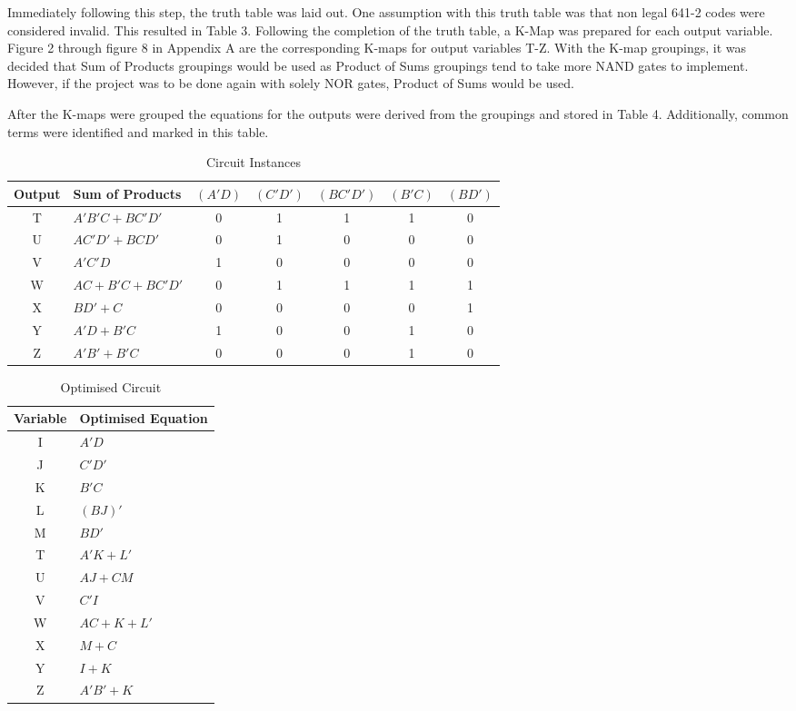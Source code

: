 \documentclass[12pt,letterpaper,titlepage]{article}
\begin{document}
\begin{raggedright}
Immediately following this step, the truth table was laid out. One assumption with this truth table was that non legal 641-2 codes were considered invalid. This resulted in Table 3. Following the completion of the truth table, a K-Map was prepared for each output variable. Figure 2 through figure 8 in Appendix A are the corresponding K-maps for output variables T-Z. With the K-map groupings, it was decided that Sum of Products groupings would be used as Product of Sums groupings tend to take more NAND gates to implement. However, if the project was to be done again with solely NOR gates, Product of Sums would be used.

After the K-maps were grouped the equations for the outputs were derived from the groupings and stored in Table 4. Additionally, common terms were identified and marked in this table.

\begin{table}[ht]
\centering
\begin{tabular}{|c|l|c|c|c|c|c|}\hline
Output & Sum of Products & $(A'D)$ & $(C'D')$ & $(BC'D')$ & $(B'C)$ & $(BD')$ \\\hline
T & $A'B'C+BC'D'$  & 0 & 1 & 1 & 1 & 0 \\\hline
U & $AC'D'+BCD'$   & 0 & 1 & 0 & 0 & 0 \\\hline
V & $A'C'D$        & 1 & 0 & 0 & 0 & 0 \\\hline
W & $AC+B'C+BC'D'$ & 0 & 1 & 1 & 1 & 1 \\\hline
X & $BD'+C$        & 0 & 0 & 0 & 0 & 1 \\\hline
Y & $A'D+B'C$      & 1 & 0 & 0 & 1 & 0 \\\hline
Z & $A'B'+B'C$     & 0 & 0 & 0 & 1 & 0 \\\hline
\end{tabular}
\caption{Circuit Instances}
\end{table}

\newpage
\begin{table}
\centering
\def\arraystretch{1.5}
\begin{tabular}{|c|l|}\hline
Variable & Optimised Equation \\\hline
I  & $A'D$                  \\\hline
J  & $C'D'$                 \\\hline
K  & $B'C$                  \\\hline
L  & $(BJ)'$                \\\hline
M  & $BD'$                  \\\hline
T  & $A'K+L'$               \\\hline
U  & $AJ+CM$                \\\hline
V  & $C'I$                  \\\hline
W  & $AC+K+L'$              \\\hline
X  & $M+C$                  \\\hline
Y  & $I+K$                  \\\hline
Z  & $A'B'+K$               \\\hline
\end{tabular}
\caption{Optimised Circuit}
\end{table}


\end{raggedright}
\end{document}
